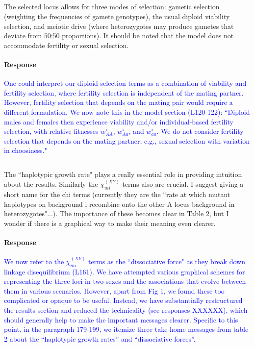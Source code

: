 \documentclass[10pt,letterpaper]{article}
\begin{document}
\noindent\subsection{}
The selected locus allows for three modes of selection: gametic selection (weighting the frequencies of gamete genotypes), the usual diploid viability selection, and meiotic drive (where heterozygotes may produce gametes that deviate from 50:50 proportions).  It should be noted that the model does not accommodate fertility or sexual selection.

\noindent\paragraph{Response}
\textcolor{blue}{
One could interpret our diploid selection terms as a combination of viability and fertility selection, where fertility selection is independent of the mating partner.
However, fertility selection that depends on the mating pair would require a different formulation.
We now note this in the model section (L120-122):
``Diploid males and females then experience viability and/or individual-based fertility selection, with relative fitnesses $w_{AA}^{\circ}$, $w_{Aa}^{\circ}$, and $w_{aa}^{\circ}$.
We do not consider fertility selection that depends on the mating partner, e.g., sexual selection with variation in choosiness."
}

\noindent\subsection{}
The ``haplotypic growth rate" plays a really essential role in providing intuition about the results. Similarly the $\chi_{mi}^{(XY)}$ terms also are crucial.  I suggest giving a short name for the chi terms (currently they are the ``rate at which mutant haplotypes on background i recombine onto the other A locus background in heterozygotes"...).   The importance of these becomes clear in Table 2, but I wonder if there is a graphical way to make their meaning even clearer.  

\noindent\paragraph{Response}
\textcolor{blue}{
We now refer to the $\chi_{mi}^{(XY)}$ terms as the ``dissociative force" as they break down linkage disequilibrium (L161). 
We have attempted various graphical schemes for representing the three loci in two sexes and the associations that evolve between them in various scenarios. 
However, apart from Fig 1, we found these too complicated or opaque to be useful. 
Instead, we have substantially restructured the results section and reduced the technicality (see responses XXXXXX), which should generally help to make the important messages clearer. 
Specific to this point, in the paragraph 179-199, we itemize three take-home messages from table 2 about the ``haplotypic growth rates'' and ``dissociative forces''. 
}
\end{document}
